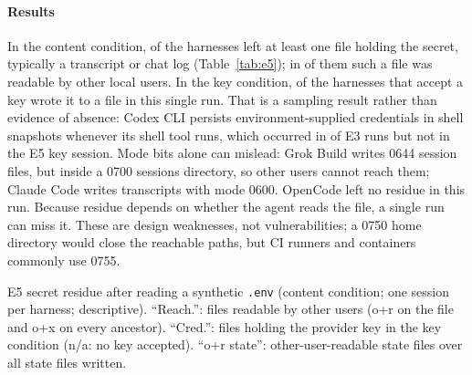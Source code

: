 \paragraph*{Results} In the content condition, \nResidueWithCopy{} of the \nResidueHarnesses{} harnesses left at least one file holding the secret, typically a transcript or chat log (Table~\ref{tab:e5})\evT{}; in \nResidueReachable{} of them such a file was readable by other local users. In the key condition, \nResidueKeyPersisted{} of the \nResidueKeyApplicable{} harnesses that accept a key wrote it to a file in this single run\evT{}. That is a sampling result rather than evidence of absence: Codex CLI persists environment-supplied credentials in shell snapshots whenever its shell tool runs, which occurred in \benchCodexSnapshotK{} of \benchCodexSnapshotN{} E3 runs but not in the E5 key session\evT{}. Mode bits alone can mislead: Grok Build writes 0644 session files, but inside a 0700 sessions directory, so other users cannot reach them\evT{}; Claude Code writes transcripts with mode 0600\evT{}. OpenCode left no residue in this run. Because residue depends on whether the agent reads the file, a single run can miss it. These are design weaknesses, not vulnerabilities; a 0750 home directory would close the reachable paths, but CI runners and containers commonly use 0755.

\begin{table}[!t]
\centering\footnotesize
\caption{E5 secret residue after reading a synthetic \texttt{.env} (content condition; one session per harness; descriptive). ``Reach.'': files readable by other users (o+r on the file and o+x on every ancestor). ``Cred.'': files holding the provider key in the key condition (n/a: no key accepted). ``o+r state'': other-user-readable state files over all state files written.}
\label{tab:e5}
\begin{adjustbox}{max width=\columnwidth}\end{adjustbox}
\end{table}

